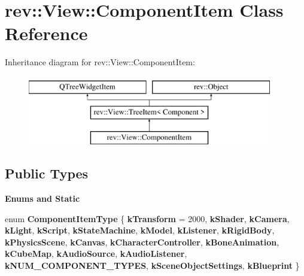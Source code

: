 \hypertarget{classrev_1_1_view_1_1_component_item}{}\section{rev\+::View\+::Component\+Item Class Reference}
\label{classrev_1_1_view_1_1_component_item}
Inheritance diagram for rev\+::View\+::Component\+Item\+:\begin{figure}[H]
\begin{center}
\leavevmode
\includegraphics[height=3.000000cm]{classrev_1_1_view_1_1_component_item}
\end{center}
\end{figure}
\subsection*{Public Types}
\begin{Indent}\textbf{ Enums and Static}\par
\begin{DoxyCompactItemize}
\item 
\mbox{\label{classrev_1_1_view_1_1_component_item_a546725d583d4dab351a487cb5218430a}} 
enum {\bfseries Component\+Item\+Type} \{ \newline
{\bfseries k\+Transform} = 2000, 
{\bfseries k\+Shader}, 
{\bfseries k\+Camera}, 
{\bfseries k\+Light}, 
\newline
{\bfseries k\+Script}, 
{\bfseries k\+State\+Machine}, 
{\bfseries k\+Model}, 
{\bfseries k\+Listener}, 
\newline
{\bfseries k\+Rigid\+Body}, 
{\bfseries k\+Physics\+Scene}, 
{\bfseries k\+Canvas}, 
{\bfseries k\+Character\+Controller}, 
\newline
{\bfseries k\+Bone\+Animation}, 
{\bfseries k\+Cube\+Map}, 
{\bfseries k\+Audio\+Source}, 
{\bfseries k\+Audio\+Listener}, 
\newline
{\bfseries k\+N\+U\+M\+\_\+\+C\+O\+M\+P\+O\+N\+E\+N\+T\+\_\+\+T\+Y\+P\+ES}, 
{\bfseries k\+Scene\+Object\+Settings}, 
{\bfseries k\+Blueprint}
 \}
\end{DoxyCompactItemize}
\end{Indent}
